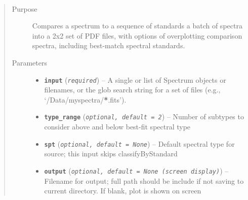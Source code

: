 \documentclass[letterpaper,10pt,english]{sphinxmanual}
\begin{document}
\begin{fulllineitems}
\label{api:splat_plot.plotSequence}~\begin{quote}\begin{description}
\item[{Purpose}] \leavevmode
Compares a spectrum to a sequence of standards a batch of spectra into a 2x2 set of PDF files, with options of overplotting comparison spectra, including best-match spectral standards.

\item[{Parameters}] \leavevmode\begin{itemize}
\item {} 
\textbf{\texttt{input}} (\emph{\texttt{required}}) -- A single or list of Spectrum objects or filenames, or the glob search string for a set of files (e.g., `/Data/myspectra/{\color{red}\bfseries{}*}.fits').

\item {} 
\textbf{\texttt{type\_range}} (\emph{\texttt{optional, default = 2}}) -- Number of subtypes to consider above and below best-fit spectral type

\item {} 
\textbf{\texttt{spt}} (\emph{\texttt{optional, default = None}}) -- Default spectral type for source; this input skips classifyByStandard

\item {} 
\textbf{\texttt{output}} (\emph{\texttt{optional, default = None (screen display)}}) -- Filename for output; full path should be include if not saving to current directory. If blank, plot is shown on screen

\end{itemize}

\end{description}\end{quote}


\end{fulllineitems}
\end{document}
